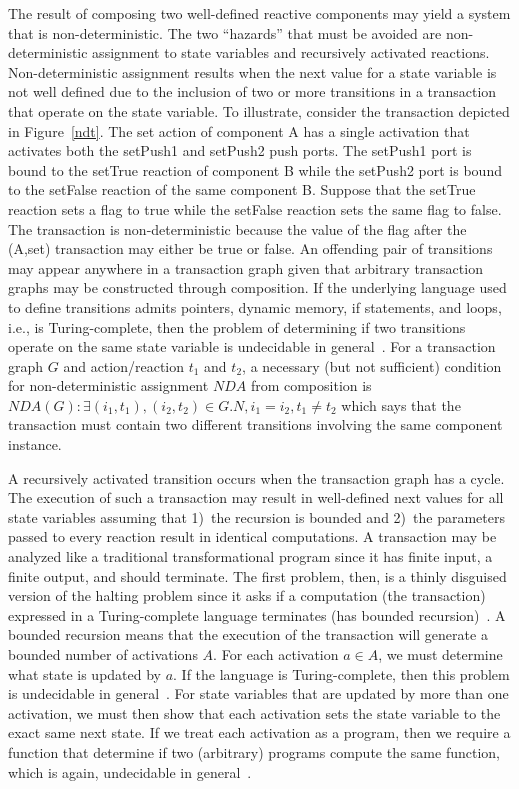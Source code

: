 The result of composing two well-defined reactive components may yield a system that is non-deterministic.
The two ``hazards'' that must be avoided are non-deterministic assignment to state variables and recursively activated reactions.
Non-deterministic assignment results when the next value for a state variable is not well defined due to the inclusion of two or more transitions in a transaction that operate on the state variable.
To illustrate, consider the transaction depicted in Figure~\ref{ndt}.
The set action of component A has a single activation that activates both the setPush1 and setPush2 push ports.
The setPush1 port is bound to the setTrue reaction of component B while the setPush2 port is bound to the setFalse reaction of the same component B.
Suppose that the setTrue reaction sets a flag to true while the setFalse reaction sets the same flag to false.
The transaction is non-deterministic because the value of the flag after the (A,set) transaction may either be true or false.
An offending pair of transitions may appear anywhere in a transaction graph given that arbitrary transaction graphs may be constructed through composition.
If the underlying language used to define transitions admits pointers, dynamic memory, if statements, and loops, i.e., is Turing-complete, then the problem of determining if two transitions operate on the same state variable is undecidable in general~\cite{Landi:1992:USA:161494.161501, Ramalingam:1994:UA:186025.186041}.
For a transaction graph $G$ and action/reaction $t_1$ and $t_2$, a necessary (but not sufficient) condition for non-deterministic assignment $\mathit{NDA}$ from composition is $\mathit{NDA}(G): \exists (i_1, t_1), (i_2, t_2) \in G.N, i_1 = i_2, t_1 \ne t_2$ which says that the transaction must contain two different transitions involving the same component instance.

A recursively activated transition occurs when the transaction graph has a cycle.
The execution of such a transaction may result in well-defined next values for all state variables assuming that 1)~the recursion is bounded and 2)~the parameters passed to every reaction result in identical computations.
A transaction may be analyzed like a traditional transformational program since it has finite input, a finite output, and should terminate.
The first problem, then, is a thinly disguised version of the halting problem since it asks if a computation (the transaction) expressed in a Turing-complete language terminates (has bounded recursion)~\cite{Turing01011937, davis1958computability}.
A bounded recursion means that the execution of the transaction will generate a bounded number of activations $A$.
For each activation $a \in A$, we must determine what state is updated by $a$.
If the language is Turing-complete, then this problem is undecidable in general~\cite{Landi:1992:USA:161494.161501, Ramalingam:1994:UA:186025.186041}.
For state variables that are updated by more than one activation, we must then show that each activation sets the state variable to the exact same next state.
If we treat each activation as a program, then we require a function that determine if two (arbitrary) programs compute the same function, which is again, undecidable in general~\cite{Rice:53}.

